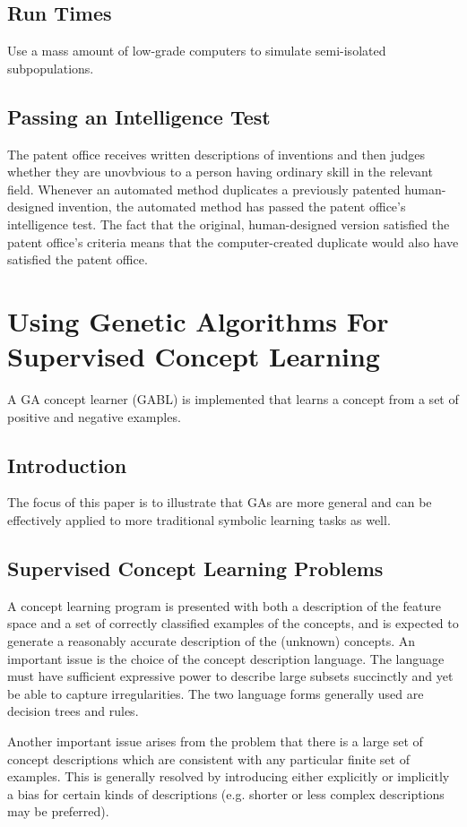 \documentclass[12pt]{article}
\begin{document}
\subsection{Run Times}
Use a mass amount of low-grade computers to simulate semi-isolated subpopulations.

\subsection{Passing an Intelligence Test}
The patent office receives written descriptions of inventions and then judges whether they are unovbvious to a person having ordinary skill in the relevant field. Whenever an automated method duplicates a previously patented  human-designed invention, the automated method has passed the patent office's intelligence test. The fact that the original, human-designed version satisfied the patent office's criteria means that the computer-created duplicate would also have satisfied the patent office.
\clearpage

\section{Using Genetic Algorithms For Supervised Concept Learning}
A GA concept learner (GABL) is implemented that learns a concept from a set of positive and negative examples.

\subsection{Introduction}
The focus of this paper is to illustrate that GAs are more general and can be effectively applied to more traditional symbolic learning tasks as well.

\subsection{Supervised Concept Learning Problems}
A concept learning program is presented with both a description of the feature space and a set of correctly classified examples of the concepts, and is expected to generate a reasonably accurate description of the (unknown) concepts. An important issue is the choice of the concept description language. The language must have sufficient expressive power to describe large subsets succinctly and yet be able to capture irregularities. The two language forms generally used are decision trees and rules.

Another important issue arises from the problem that there is a large set of concept descriptions which are consistent with any particular finite set of examples. This is generally resolved  by introducing either explicitly or implicitly a bias for certain kinds of descriptions (e.g. shorter or less complex descriptions may be preferred).
\end{document}

